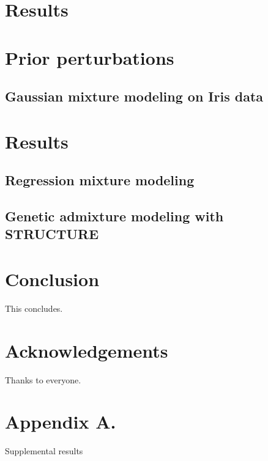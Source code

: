 \documentclass[11pt]{article}
\begin{document}
\section{Results}


\section{Prior perturbations}


\subsection{Gaussian mixture modeling on Iris data}


\section{Results}

\subsection{Regression mixture modeling}


\subsection{Genetic admixture modeling with STRUCTURE}


\section{Conclusion}
This concludes.


\section{Acknowledgements}
Thanks to everyone.






\newpage

\appendix
\section*{Appendix A.}
\label{app:theorem}

Supplemental results
\end{document}

